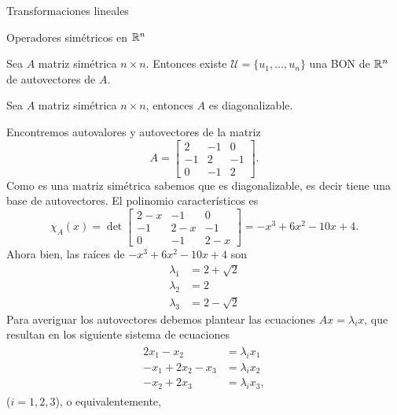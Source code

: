 \begin{chapter}{Transformaciones lineales}
\begin{section}{Operadores simétricos en $\mathbb R^n$}
    \begin{teorema} Sea $A$ matriz simétrica $n \times n$. Entonces existe $\mathcal{U} = \{u_1,\ldots,u_n\}$ una BON de $\mathbb R^n$ de autovectores de $A$.
    \end{teorema}


    \begin{corolario}
         Sea $A$ matriz simétrica $n \times n$, entonces $A$ es diagonalizable.
    \end{corolario}


    \begin{ejemplo*} Encontremos autovalores y autovectores de  la matriz
        \begin{equation*}
            A = \begin{bmatrix} 2&-1&0\\-1&2&-1\\0&-1&2 \end{bmatrix}.
        \end{equation*}
        Como es una matriz simétrica sabemos que es diagonalizable, es decir tiene una base de autovectores. 
        El polinomio característicos es
        \begin{equation*}
            \chi_A(x) = \det  \begin{bmatrix} 2-x&-1&0\\-1&2-x&-1\\0&-1&2-x \end{bmatrix} =	-x^3 + 6 x^2 - 10 x + 4.
        \end{equation*}
        Ahora bien, las raíces de $-x^3 + 6 x^2 - 10 x + 4 $  son 
        \begin{align*}
            \lambda_1 &= 2 + \sqrt 2 \\
            \lambda_2 &= 2 \\
            \lambda_3 &= 2 - \sqrt 2
        \end{align*}
        Para averiguar los autovectores debemos plantear las ecuaciones $Ax = \lambda_ix$,  que resultan en los siguiente sistema de ecuaciones
        \begin{align*}
        \begin{split}
        2x_1 - x_2  &= \lambda_i x_1 \\
        -x_1 + 2x_2 -x_3 &=\lambda_ix_2 \\
        -x_2 + 2x_3 &= \lambda_ix_3,  
        \end{split}
        \end{align*}
        ($i=1,2,3$),  o equivalentemente,

\end{ejemplo*}
\end{section}
\end{chapter}
